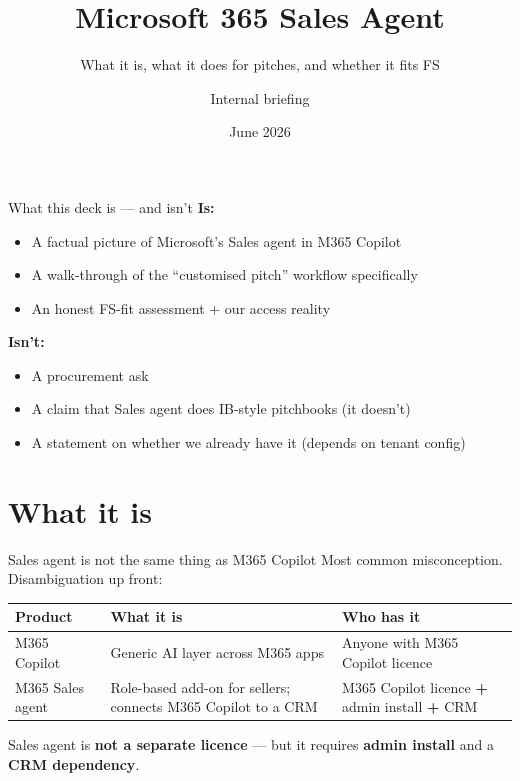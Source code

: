 \documentclass[11pt,aspectratio=169]{beamer}
\title{Microsoft 365 Sales Agent}
\subtitle{What it is, what it does for pitches, and whether it fits FS}
\author{Internal briefing}
\institute{Informational --- no procurement ask}
\date{June 2026}
\newcommand{\hl}[1]{\textbf{\textcolor{accentteal}{#1}}}
\begin{document}
\maketitle

\begin{frame}{What this deck is --- and isn't}
  \textbf{Is:}
  \begin{itemize}
    \item A factual picture of Microsoft's Sales agent in M365 Copilot
    \item A walk-through of the ``customised pitch'' workflow specifically
    \item An honest FS-fit assessment + our access reality
  \end{itemize}
  \vfill
  \textbf{Isn't:}
  \begin{itemize}
    \item A procurement ask
    \item A claim that Sales agent does IB-style pitchbooks (it doesn't)
    \item A statement on whether we already have it (depends on tenant config)
  \end{itemize}
\end{frame}

\section{What it is}

\begin{frame}{Sales agent is not the same thing as M365 Copilot}
  Most common misconception. Disambiguation up front:

  \medskip
  \centering\small
  \begin{tabular}{lp{}p{}}
    \toprule
    \textbf{Product} & \textbf{What it is} & \textbf{Who has it} \\
    \midrule
    M365 Copilot       & Generic AI layer across M365 apps & Anyone with M365 Copilot licence \\
    M365 Sales agent   & Role-based add-on for sellers; connects M365 Copilot to a CRM & M365 Copilot licence \textbf{+} admin install \textbf{+} CRM \\
    \bottomrule
  \end{tabular}

  \vfill
  \raggedright Sales agent is \hl{not a separate licence} --- but it requires \hl{admin install} and a \hl{CRM dependency}.
\end{frame}
\end{document}
